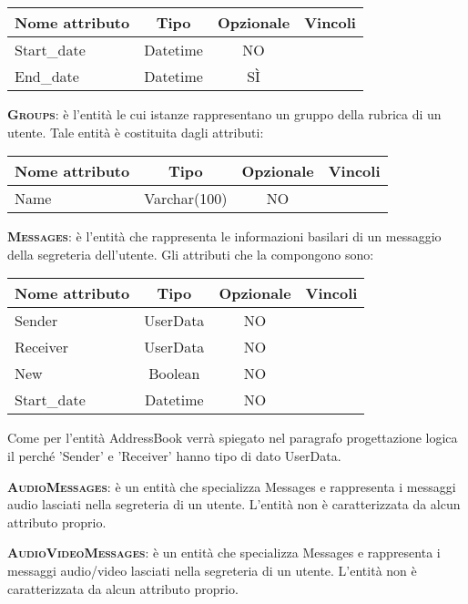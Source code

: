 \begin{description}
\begin{center}
\begin{tabular}{lccc}
\toprule
Nome attributo & Tipo & Opzionale & Vincoli\\
\midrule
Start\_date & Datetime & NO & \\
End\_date & Datetime & SÌ & \\
\bottomrule
\end{tabular}
\end{center}

	\item{\scshape\bfseries Groups}: è l'entità le cui istanze rappresentano un gruppo della rubrica di un utente. Tale entità è costituita dagli attributi:

\begin{center}
\begin{tabular}{lccc}
\toprule
Nome attributo & Tipo & Opzionale & Vincoli\\
\midrule
Name & Varchar(100) & NO &\\
\bottomrule
\end{tabular}
\end{center}	
	
	\item{\scshape\bfseries Messages}: è l'entità che rappresenta le informazioni basilari di un messaggio della segreteria dell'utente. Gli attributi che la compongono sono:

\begin{center}
\begin{tabular}{lccc}
\toprule
Nome attributo & Tipo & Opzionale & Vincoli\\
\midrule
Sender & UserData & NO &\\
Receiver & UserData & NO &\\
New & Boolean & NO & \\
Start\_date & Datetime & NO & \\
\bottomrule
\end{tabular}
\end{center}	

Come per l'entità AddressBook verrà spiegato nel paragrafo progettazione logica il perché 'Sender' e 'Receiver' hanno tipo di dato UserData.
	
	\item{\scshape\bfseries AudioMessages}: è un entità che specializza Messages e rappresenta i messaggi audio lasciati nella segreteria di un utente. L'entità non è caratterizzata da alcun attributo proprio.
	
	\item{\scshape\bfseries AudioVideoMessages}: è un entità che specializza Messages e rappresenta i messaggi audio/video lasciati nella segreteria di un utente.  L'entità non è caratterizzata da alcun attributo proprio.	
	
\end{description}

